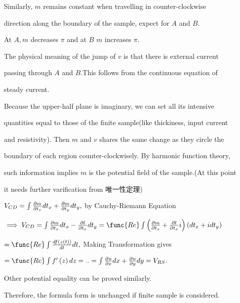 \documentclass{article}
\begin{document}
Similarly, $m$ remains constant when travelling in counter-clockwise

direction along the boundary of the sample, expect for $A$ and $B.$

At $A,m$ decreases $\pi $ and at $B$ $m$ increases $\pi .$

The physical meaning of the jump of $v$ is that there is external current

passing through $A$ and $B.$This follows from the continuous equation of 

steady current.

Because the upper-half plane is imaginary, we can set all its intensive 

quantities equal to those of the finite sample(like thickiness, input current

and resistivity). Then $m$ and $v$ shares the same change as they circle the 

boundary of each region counter-clockwisely. By harmonic function theory,

such information implies $m$ is the potential field of the sample.(At this
point

it needs further varification from 唯一性定理)

$V_{CD}=\int \frac{\partial m}{\partial t_{x}}dt_{x}+\frac{\partial m}{%
\partial t_{y}}dt_{y},$ by Cauchy-Riemann Equation

$\implies V_{CD}=\int \frac{\partial m}{\partial t_{x}}dt_{x}-\frac{\partial
l}{\partial t_{x}}dt_{y}=\func{Re}\int \left( \frac{\partial m}{\partial
t_{x}}+\frac{\partial l}{\partial t_{x}}i\right) \left(
dt_{x}+idt_{y}\right) $

$=\func{Re}\int \frac{df\left( z\left( t\right) \right) }{dt}dt,$ Making
Transformation gives

$=\func{Re}\int f^{\prime }\left( z\right) dz=..=\int \frac{\partial u}{%
\partial x}dx+\frac{\partial u}{\partial y}dy=V_{RS}.$

Other potential equality can be proved similarly.

Therefore, the formula form is unchanged if finite sample is considered.
\end{document}
